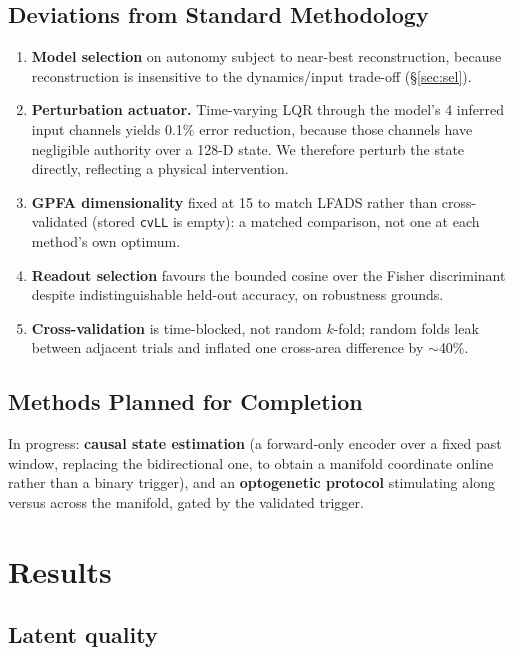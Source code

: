 \documentclass[10pt,twocolumn]{article}
\begin{document}
\subsection{Deviations from Standard Methodology}

\begin{enumerate}
\item \textbf{Model selection} on autonomy subject to near-best reconstruction,
because reconstruction is insensitive to the dynamics/input trade-off
(\S\ref{sec:sel}).
\item \textbf{Perturbation actuator.} Time-varying LQR through the model's 4
inferred input channels yields 0.1\% error reduction, because those channels have
negligible authority over a 128-D state. We therefore perturb the state
directly, reflecting a physical intervention.
\item \textbf{GPFA dimensionality} fixed at 15 to match LFADS rather than
cross-validated (stored \texttt{cvLL} is empty): a matched comparison, not one
at each method's own optimum.
\item \textbf{Readout selection} favours the bounded cosine over the Fisher
discriminant despite indistinguishable held-out accuracy, on robustness grounds.
\item \textbf{Cross-validation} is time-blocked, not random $k$-fold; random
folds leak between adjacent trials and inflated one cross-area difference by
$\sim$40\%.
\end{enumerate}

\subsection{Methods Planned for Completion}

In progress: \textbf{causal state estimation} (a forward-only encoder over a
fixed past window, replacing the bidirectional one, to obtain a manifold
coordinate online rather than a binary trigger), and an \textbf{optogenetic
protocol} stimulating along versus across the manifold, gated by the validated
trigger.

\section{Results}

\subsection{Latent quality}
\end{document}

